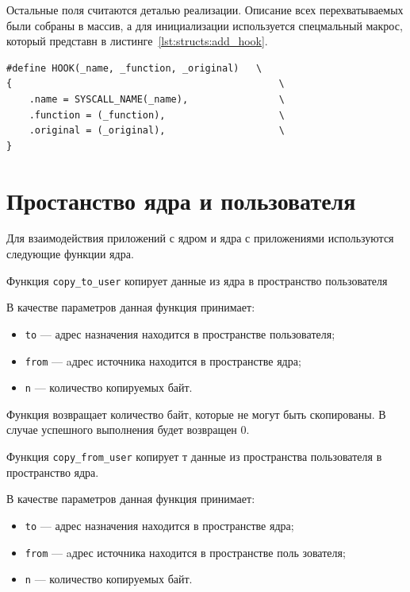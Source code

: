 Остальные поля считаются деталью реализации. Описание всех перехватываемых были собраны в массив, а для инициализации используется спецмальный макрос, который представн в листинге~\ref{lst:structs:add_hook}.

\clearpage

\begin{lstlisting}[label=lst:structs:add_hook,caption=Макрос HOOK()]	
#define HOOK(_name, _function, _original)   \
{                                               \
	.name = SYSCALL_NAME(_name),                \
	.function = (_function),                    \
	.original = (_original),                    \
}
\end{lstlisting}

\section{Простанство ядра и пользователя}

Для взаимодействия приложений с ядром и ядра с приложениями используются следующие функции ядра.

Функция \texttt{copy\_to\_user} копирует данные из ядра в пространство пользователя



В качестве параметров данная функция принимает:
\begin{itemize}
	\item \texttt{to} --- адрес назначения находится в пространстве пользователя;
	\item \texttt{from} --- aдрес источника находится в пространстве ядра;
	\item \texttt{n} --- количество копируемых байт.
\end{itemize}

Функция возвращает количество байт, которые не могут быть скопированы. 
В случае успешного выполнения будет возвращен 0.

Функция \texttt{copy\_from\_user} копирует т данные из пространства пользователя в пространство ядра.



В качестве параметров данная функция принимает:
\begin{itemize}
	\item \texttt{to} --- адрес назначения находится в пространстве ядра;
	\item \texttt{from} --- aдрес источника находится в пространстве поль зователя;
	\item \texttt{n} --- количество копируемых байт.
\end{itemize}

